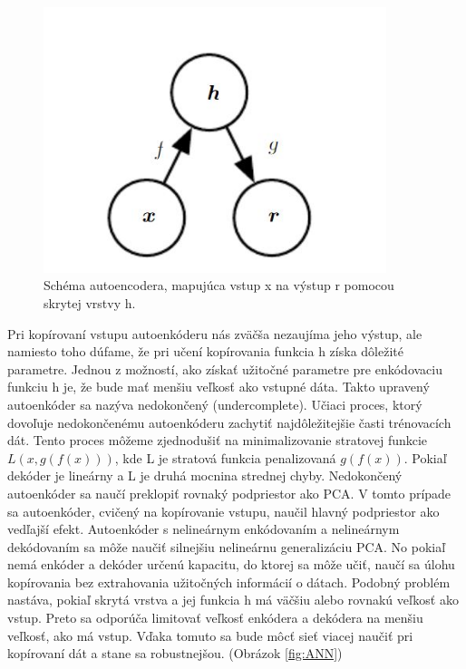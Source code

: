 \begin{figure}[h!]
\begin{centering}
\includegraphics[width=10cm]{assets/images/234_1.JPG}
\par\end{centering}
\caption{Schéma autoencodera, mapujúca vstup x na výstup r pomocou skrytej vrstvy h. \label{fig:autoencoder}\cite{Goodfellow-et-al-2016}}
\end{figure}

\hspace{10mm}Pri kopírovaní vstupu autoenkóderu nás zväčša nezaujíma jeho výstup, ale namiesto toho dúfame, že pri učení kopírovania funkcia h získa dôležité parametre. Jednou z možností, ako získať užitočné parametre pre enkódovaciu funkciu h je, že bude mať menšiu veľkosť ako vstupné dáta. Takto upravený autoenkóder sa nazýva nedokončený (undercomplete). Učiaci proces, ktorý dovoľuje nedokončenému autoenkóderu zachytiť najdôležitejšie časti trénovacích dát. Tento proces môžeme zjednodušiť na minimalizovanie stratovej funkcie \(L(x, g(f(x)))\), kde L je stratová funkcia penalizovaná \(g(f(x))\). Pokiaľ dekóder je lineárny a L je druhá mocnina strednej chyby. Nedokončený autoenkóder sa naučí preklopiť rovnaký podpriestor ako PCA. V tomto prípade sa autoenkóder, cvičený na kopírovanie vstupu, naučil hlavný podpriestor ako vedľajší efekt. Autoenkóder s nelineárnym enkódovaním a nelineárnym dekódovaním sa môže naučiť silnejšiu nelineárnu generalizáciu PCA. No pokiaľ nemá enkóder a dekóder určenú kapacitu, do ktorej sa môže učiť, naučí sa úlohu kopírovania bez extrahovania užitočných informácií o dátach.  Podobný problém nastáva, pokiaľ skrytá vrstva a jej funkcia h  má väčšiu alebo rovnakú veľkosť ako vstup. Preto sa odporúča limitovať veľkosť enkódera a dekódera na menšiu veľkosť, ako má vstup. Vďaka tomuto sa bude môcť sieť viacej naučiť pri kopírovaní dát a stane sa robustnejšou. (Obrázok \ref{fig:ANN})

